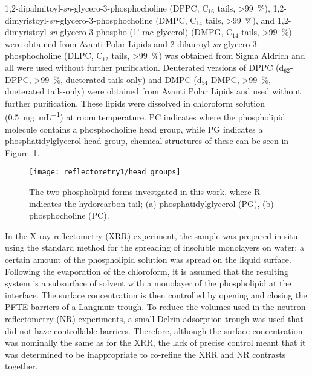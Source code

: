 1,2-dipalmitoyl-\emph{sn}-glycero-3-phosphocholine (DPPC, C$_{16}$ tails, \SI{>99}{\percent}), 1,2-dimyristoyl-\emph{sn}-glycero-3-phosphocholine (DMPC, C$_{14}$ tails, \SI{>99}{\percent}), and 1,2-dimyristoyl-\emph{sn}-glycero-3-phospho-(1'-rac-glycerol) (DMPG, C$_{14}$ tails, \SI{>99}{\percent}) were obtained from Avanti Polar Lipids and 2-dilauroyl-\emph{sn}-glycero-3-phosphocholine (DLPC, C$_{12}$ tails, \SI{>99}{\percent}) was obtained from Sigma Aldrich and all were used without further purification. Deuterated versions of DPPC (d$_{62}$-DPPC, \SI{>99}{\percent}, dueterated tails-only) and DMPC (d$_{54}$-DMPC, \SI{>99}{\percent}, dueterated tails-only) were obtained from Avanti Polar Lipids and used without further purification.
These lipids were dissolved in chloroform solution (\SI{0.5}{\milli\gram\per\milli\liter}) at room temperature.
PC indicates where the phospholipid molecule contains a phosphocholine head group, while PG indicates a phosphatidylglycerol head group, chemical structures of these can be seen in Figure~\ref{fig:heads}.
%
\begin{figure}
    \centering
    \texttt{[image: reflectometry1/head\_groups]}
    \caption{The two phospholipid forms investgated in this work, where R indicates the hydorcarbon tail; (a) phosphatidylglycerol (PG), (b) phosphocholine (PC).}
    \label{fig:heads}
\end{figure}
%

In the X-ray reflectometry (XRR) experiment, the sample was prepared in-situ using the standard method for the spreading of insoluble monolayers on water: a certain amount of the phospholipid solution was spread on the liquid surface.
Following the evaporation of the chloroform, it is assumed that the resulting system is a subsurface of solvent with a monolayer of the phospholipid at the interface.
The surface concentration is then controlled by opening and closing the PFTE barriers of a Langmuir trough.
To reduce the volumes used in the neutron reflectometry (NR) experiments, a small Delrin adsorption trough was used that did not have controllable barriers.
Therefore, although the surface concentration was nominally the same as for the XRR, the lack of precise control meant that it was determined to be inappropriate to co-refine the XRR and NR contrasts together.

